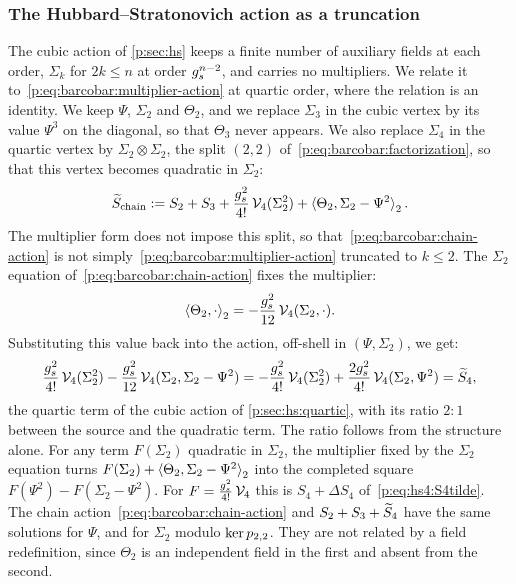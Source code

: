 
\subsubsection{The Hubbard--Stratonovich action as a truncation}
\label{p:sec:barcobar:truncation}

The cubic action of \cref{p:sec:hs} keeps a finite number of auxiliary fields at each order, $\Sigma_k$ for $2 k \le n$ at order $\gs^{n-2}$, and carries no multipliers.
We relate it to~\eqref{p:eq:barcobar:multiplier-action} at quartic order, where the relation is an identity.
We keep $\Psi$, $\Sigma_2$ and $\Theta_2$, and we replace $\Sigma_3$ in the cubic vertex by its value $\Psi^3$ on the diagonal, so that $\Theta_3$ never appears.
We also replace $\Sigma_4$ in the quartic vertex by $\Sigma_2 \otimes \Sigma_2$, the split $(2, 2)$ of~\eqref{p:eq:barcobar:factorization}, so that this vertex becomes quadratic in $\Sigma_2$:
\begin{equation}
  \label{p:eq:barcobar:chain-action}
  \caction[\mathrm{chain}]
    := S_2 + S_3
      + \frac{\gs^2}{4!} \, \vertex{4}(\Sigma_2^2)
      + \pair[2]{\Theta_2}{\Sigma_2 - \Psi^2}.
\end{equation}
The multiplier form does not impose this split, so that~\eqref{p:eq:barcobar:chain-action} is not simply~\eqref{p:eq:barcobar:multiplier-action} truncated to $k \le 2$.
The $\Sigma_2$ equation of~\eqref{p:eq:barcobar:chain-action} fixes the multiplier:
\begin{equation}
  \label{p:eq:barcobar:composite-multiplier}
  \pair[2]{\Theta_2}{\cdot}
    = - \frac{\gs^2}{12} \, \vertex{4}(\Sigma_2, \cdot).
\end{equation}
Substituting this value back into the action, off-shell in $(\Psi, \Sigma_2)$, we get:
\begin{equation}
  \label{p:eq:barcobar:identity}
  \frac{\gs^2}{4!} \, \vertex{4}(\Sigma_2^2)
    - \frac{\gs^2}{12} \, \vertex{4}(\Sigma_2, \Sigma_2 - \Psi^2)
    = - \frac{\gs^2}{4!} \, \vertex{4}(\Sigma_2^2)
      + \frac{2 \gs^2}{4!} \, \vertex{4}(\Sigma_2, \Psi^2)
    = \caction[4],
\end{equation}
the quartic term of the cubic action of \cref{p:sec:hs:quartic}, with its ratio $2 : 1$ between the source and the quadratic term.
The ratio follows from the structure alone.
For any term $F(\Sigma_2)$ quadratic in $\Sigma_2$, the multiplier fixed by the $\Sigma_2$ equation turns $F(\Sigma_2) + \pair[2]{\Theta_2}{\Sigma_2 - \Psi^2}$ into the completed square $F(\Psi^2) - F(\Sigma_2 - \Psi^2)$.
For $F = \tfrac{\gs^2}{4!} \, \vertex{4}$ this is $S_4 + \Delta S_4$ of~\eqref{p:eq:hs4:S4tilde}.
The chain action~\eqref{p:eq:barcobar:chain-action} and $S_2 + S_3 + \caction[4]$ have the same solutions for $\Psi$, and for $\Sigma_2$ modulo $\ker \sprod{2}{2}$.
They are not related by a field redefinition, since $\Theta_2$ is an independent field in the first and absent from the second.

